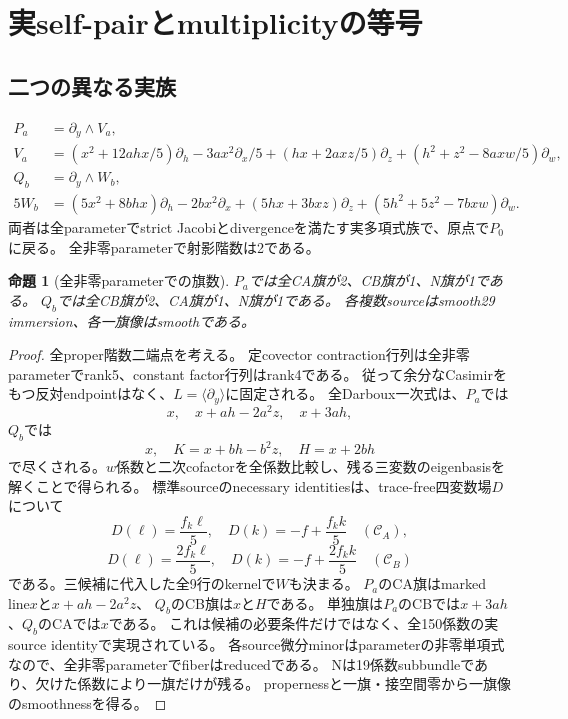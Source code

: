 \documentclass[11pt,a4paper]{ltjsarticle}
\newcommand{\CA}{\mathcal C_A}
\newcommand{\CB}{\mathcal C_B}
\newtheorem{proposition}[theorem]{命題}
\theoremstyle{definition}
\theoremstyle{remark}
\begin{document}
\section{実self-pairとmultiplicityの等号}

\subsection{二つの異なる実族}

\begin{align}
 P_a&=\partial_y\wedge V_a,\nonumber\\[-1mm]
 V_a&=(x^2+12ahx/5)\partial_h-3ax^2\partial_x/5
 +(hx+2axz/5)\partial_z+(h^2+z^2-8axw/5)\partial_w,\label{eq:Pa}\\
 Q_b&=\partial_y\wedge W_b,\nonumber\\[-1mm]
 5W_b&=(5x^2+8bhx)\partial_h-2bx^2\partial_x
 +(5hx+3bxz)\partial_z+(5h^2+5z^2-7bxw)\partial_w.\label{eq:Qb}
\end{align}
両者は全parameterでstrict Jacobiとdivergenceを満たす実多項式族で、原点で$P_0$に戻る。
全非零parameterで射影階数は2である。

\begin{proposition}[全非零parameterでの旗数]\label{prop:flags}
$P_a$では全CA旗が2、CB旗が1、N旗が1である。
$Q_b$では全CB旗が2、CA旗が1、N旗が1である。
各複数sourceはsmooth29 immersion、各一旗像はsmoothである。
\end{proposition}
\begin{proof}
全proper階数二端点を考える。
定covector contraction行列は全非零parameterでrank5、constant factor行列はrank4である。
従って余分なCasimirをもつ反対endpointはなく、$L=\langle\partial_y\rangle$に固定される。
全Darboux一次式は、$P_a$では
\[
 x,\quad x+ah-2a^2z,\quad x+3ah,
\]
$Q_b$では
\[
 x,\quad K=x+bh-b^2z,\quad H=x+2bh
\]
で尽くされる。$w$係数と二次cofactorを全係数比較し、残る三変数のeigenbasisを解くことで得られる。
標準sourceのnecessary identitiesは、trace-free四変数場$D$について
\[
 D(\ell)=\frac{f_k\ell}{5},\quad D(k)=-f+\frac{f_kk}{5}
 \quad(\CA),
\]
\[
 D(\ell)=\frac{2f_k\ell}{5},\quad D(k)=-f+\frac{2f_kk}{5}
 \quad(\CB)
\]
である。三候補に代入した全9行のkernelで$W$も決まる。
$P_a$のCA旗はmarked line$x$と$x+ah-2a^2z$、
$Q_b$のCB旗は$x$と$H$である。
単独旗は$P_a$のCBでは$x+3ah$、$Q_b$のCAでは$x$である。
これは候補の必要条件だけではなく、全150係数の実source identityで実現されている。
各source微分minorはparameterの非零単項式なので、全非零parameterでfiberはreducedである。
Nは19係数subbundleであり、欠けた係数により一旗だけが残る。
propernessと一旗・接空間零から一旗像のsmoothnessを得る。
\end{proof}
\end{document}
